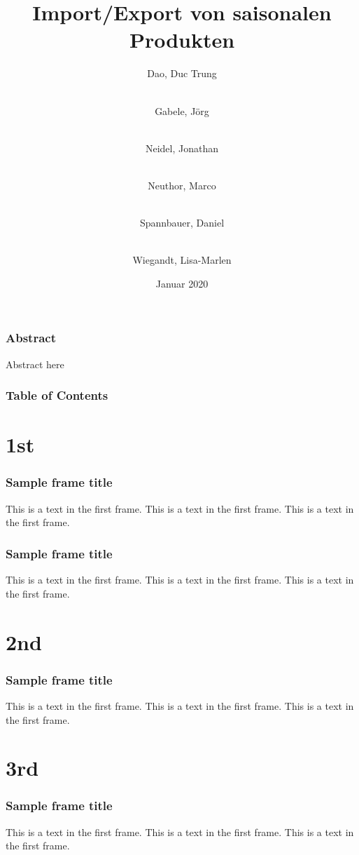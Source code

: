 \documentclass{beamer}
\title{Import/Export von saisonalen Produkten}
\author[Dao, Gabele, Neidel, Neuthor, Spannbauer, Wiegandt]{
  Dao, Duc Trung \and\\
  Gabele, Jörg \and\\
  Neidel, Jonathan \and\\
  Neuthor, Marco \and\\
  Spannbauer, Daniel \and\\
  Wiegandt, Lisa-Marlen
}
\date{Januar 2020}
\institute{HTW Berlin, Angewandte Informatik}
\begin{document}
\frame{\titlepage}

\begin{frame}
\frametitle{Abstract}
Abstract here
\end{frame}

\begin{frame}
\frametitle{Table of Contents}
\tableofcontents
\end{frame}


\section{1st}
\begin{frame}
\frametitle{Sample frame title}
This is a text in the first frame. This is a text in the first frame. This is a text in the first frame.
\end{frame}
\begin{frame}
\frametitle{Sample frame title}
This is a text in the first frame. This is a text in the first frame. This is a text in the first frame.
\end{frame}

\section{2nd}
\begin{frame}
\frametitle{Sample frame title}
This is a text in the first frame. This is a text in the first frame. This is a text in the first frame.
\end{frame}

\section{3rd}
\begin{frame}
\frametitle{Sample frame title}
This is a text in the first frame. This is a text in the first frame. This is a text in the first frame.
\end{frame}


\end{document}
